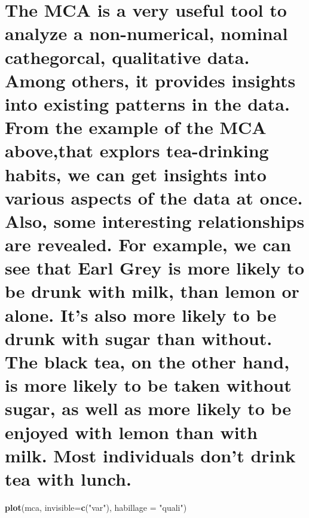 \documentclass[]{article}
\newenvironment{Shaded}{\begin{snugshade}}{\end{snugshade}}
\newcommand{\DataTypeTok}[1]{\textcolor[rgb]{0.13,0.29,0.53}{#1}}
\newcommand{\KeywordTok}[1]{\textcolor[rgb]{0.13,0.29,0.53}{\textbf{#1}}}
\newcommand{\NormalTok}[1]{#1}
\newcommand{\StringTok}[1]{\textcolor[rgb]{0.31,0.60,0.02}{#1}}
\begin{document}
\hypertarget{the-mca-is-a-very-useful-tool-to-analyze-a-non-numerical-nominal-cathegorcal-qualitative-data.-among-others-it-provides-insights-into-existing-patterns-in-the-data.-from-the-example-of-the-mca-abovethat-explors-tea-drinking-habits-we-can-get-insights-into-various-aspects-of-the-data-at-once.-also-some-interesting-relationships-are-revealed.-for-example-we-can-see-that-earl-grey-is-more-likely-to-be-drunk-with-milk-than-lemon-or-alone.-its-also-more-likely-to-be-drunk-with-sugar-than-without.-the-black-tea-on-the-other-hand-is-more-likely-to-be-taken-without-sugar-as-well-as-more-likely-to-be-enjoyed-with-lemon-than-with-milk.-most-individuals-dont-drink-tea-with-lunch.}{%
\section{The MCA is a very useful tool to analyze a non-numerical,
nominal cathegorcal, qualitative data. Among others, it provides
insights into existing patterns in the data. From the example of the MCA
above,that explors tea-drinking habits, we can get insights into various
aspects of the data at once. Also, some interesting relationships are
revealed. For example, we can see that Earl Grey is more likely to be
drunk with milk, than lemon or alone. It's also more likely to be drunk
with sugar than without. The black tea, on the other hand, is more
likely to be taken without sugar, as well as more likely to be enjoyed
with lemon than with milk. Most individuals don't drink tea with
lunch.}\label{the-mca-is-a-very-useful-tool-to-analyze-a-non-numerical-nominal-cathegorcal-qualitative-data.-among-others-it-provides-insights-into-existing-patterns-in-the-data.-from-the-example-of-the-mca-abovethat-explors-tea-drinking-habits-we-can-get-insights-into-various-aspects-of-the-data-at-once.-also-some-interesting-relationships-are-revealed.-for-example-we-can-see-that-earl-grey-is-more-likely-to-be-drunk-with-milk-than-lemon-or-alone.-its-also-more-likely-to-be-drunk-with-sugar-than-without.-the-black-tea-on-the-other-hand-is-more-likely-to-be-taken-without-sugar-as-well-as-more-likely-to-be-enjoyed-with-lemon-than-with-milk.-most-individuals-dont-drink-tea-with-lunch.}}

\begin{Shaded}
\begin{Highlighting}[]
\KeywordTok{plot}\NormalTok{(mca, }\DataTypeTok{invisible=}\KeywordTok{c}\NormalTok{(}\StringTok{"var"}\NormalTok{), }\DataTypeTok{habillage =} \StringTok{"quali"}\NormalTok{)}
\end{Highlighting}
\end{Shaded}
\end{document}
